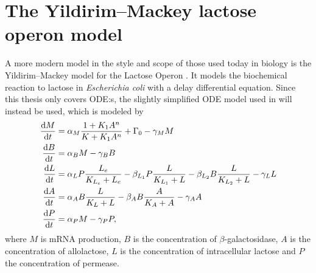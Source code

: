 \section{The Yildirim--Mackey lactose operon model}

A more modern model in the style and scope of those used today in biology is the Yildirim--Mackey model for the Lactose Operon \cite{yildirim2003feedback}.
It models the biochemical reaction to lactose in \textit{Escherichia coli} with a delay differential equation.
Since this thesis only covers ODE:s, the slightly simplified ODE model used in \cite{yildirim2011deterministic} will instead be used, which is modeled by
\begin{subequations} \label{eq:lac-operon}
  \begin{align}
    \diff{M}{t} &= \alpha_M \frac{1 + K_1 A^n}{K + K_1 A^n} + \Gamma_0 - \gamma_M M \\
    \diff{B}{t} &= \alpha_B M - \gamma_B B \\
    \diff{L}{t} &= \alpha_L P \frac{L_e}{K_{L_e} + L_e} - \beta_{L_1} P \frac{L}{K_{L_1} + L} - \beta_{L_2} B \frac{L}{K_{L_2} + L} - \gamma_L L \\
    \diff{A}{t} &= \alpha_A B \frac{L}{K_L + L} - \beta_A B \frac{A}{K_A + A} - \gamma_A A \\
    \diff{P}{t} &= \alpha_P M - \gamma_P P,
  \end{align}
\end{subequations}
where \(M\) is mRNA production, \(B\) is the concentration of \(\beta\)-galactosidase, \(A\) is the concentration of allolactose, \(L\) is the concentration of intracellular lactose and \(P\) the concentration of permease.
